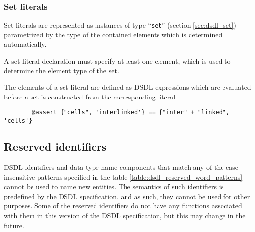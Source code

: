 \subsubsection{Set literals}

Set literals are represented as instances of type ``\verb|set|'' (section \ref{sec:dsdl_set})
parametrized by the type of the contained elements which is determined automatically.

A set literal declaration must specify at least one element,
which is used to determine the element type of the set.

The elements of a set literal are defined as DSDL expressions which are evaluated before a set is constructed
from the corresponding literal.

\begin{remark}
    \begin{verbatim}
        @assert {"cells", 'interlinked'} == {"inter" + "linked", 'cells'}
    \end{verbatim}
\end{remark}

\subsection{Reserved identifiers}\label{sec:dsdl_reserved_identifiers}

DSDL identifiers and data type name components that match any of the
case-insensitive patterns specified in the table \ref{table:dsdl_reserved_word_patterns}
cannot be used to name new entities.
The semantics of such identifiers is predefined by the DSDL specification,
and as such, they cannot be used for other purposes.
Some of the reserved identifiers do not have any functions associated with them
in this version of the DSDL specification, but this may change in the future.

